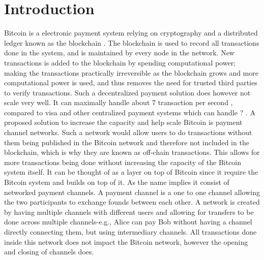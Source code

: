 \chapter{Introduction}
\label{chap:introduction}

Bitcoin is a electronic payment system relying on cryptography and a distributed ledger known as the blockchain \cite{nakamoto2008bitcoin}. 
The blockchain is used to record all transactions done in the system, and is maintained by every node in the network. New transactions is added to the blockchain by spending computational power; making the transactions practically irreversible as the blockchain grows and more computational power is used, and thus removes the need for trusted third parties to verify transactions. Such a decentralized payment solution does however not scale very well. It can maximally handle about 7 transaction per second , compared to visa and other centralized payment systems which can handle ? .
A proposed solution to increase the capacity and help scale Bitcoin is payment channel networks. Such a network would allow users to do  transactions without them being published in the Bitcoin network and therefore not included in the blockchain, which is why they are known as off-chain transactions. This allows for more transactions being done without increasing the capacity of the Bitcoin system itself. It can be thought of as a layer on top of Bitcoin since it require the Bitcoin system and builds on top of it. As the name implies it consist of networked payment channels. A payment channel is a one to one channel allowing the two participants to exchange founds between each other. A network is created by having multiple channels with different users and allowing for transfers to be done across multiple channels-e.g., Alice can pay Bob without having a channel directly connecting them, but using intermediary channels. All transactions done inside this network does not impact the Bitcoin network, however the opening and closing of channels does.
\\ 

